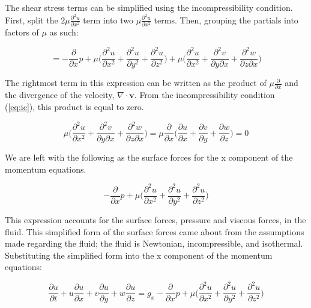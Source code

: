 \documentclass[twocolumn,12pth]{article}
\begin{document}
The shear stress terms can be simplified using the incompressibility condition.
First, split the $2\mu\frac{\partial^2u}{\partial{x}^2}$ term into two $\mu\frac{\partial^2u}{\partial{x}^2}$ terms.
Then, grouping the partials into factors of $\mu$ as such: 

\begin{equation*}
= -\frac{\partial}{\partial{x}}p + \mu \bigg( \frac{\partial^2u}{\partial{x}^2} + \frac{\partial^2u}{\partial{y}^2} + \frac{\partial^2u}{\partial{z}^2} \bigg) + \mu \bigg( \frac{\partial^2u}{\partial{x}^2} + \frac{\partial^2v}{\partial{y}\partial{x}} + \frac{\partial^2w}{\partial{z}\partial{x}}  \bigg)
\end{equation*}

The rightmost term in this expression can be written as the product of $\mu\frac{\partial}{\partial{x}}$ and the divergence of the velocity, $\nabla \cdot \mathbf{v}$.
From the incompressibility condition (\ref{eq:ic}), this product is equal to zero.

\begin{equation*}
\mu \bigg( \frac{\partial^2u}{\partial{x}^2} + \frac{\partial^2v}{\partial{y}\partial{x}} + \frac{\partial^2w}{\partial{z}\partial{x}}  \bigg) = \mu \frac{\partial}{\partial{x}} \bigg( \frac{\partial{u}}{\partial{x}} + \frac{\partial{v}}{\partial{y}} + \frac{\partial{w}}{\partial{z}}  \bigg) = 0
\end{equation*}

We are left with the following as the surface forces for the x component of the momentum equations.

\begin{equation}
-\frac{\partial}{\partial{x}}p + \mu \bigg( \frac{\partial^2u}{\partial{x}^2} + \frac{\partial^2u}{\partial{y}^2} + \frac{\partial^2u}{\partial{z}^2} \bigg)
\end{equation}

This expression accounts for the surface forces, pressure and viscous forces, in the fluid.
This simplified form of the surface forces came about from the assumptions made regarding the fluid; the fluid is Newtonian, incompressible, and isothermal.
Substituting the simplified form into the x component of the momentum equations:

\begin{equation}
\frac{\partial{u}}{\partial{t}} + u\frac{\partial{u}}{\partial{x}} + v\frac{\partial{u}}{\partial{y}} + w\frac{\partial{u}}{\partial{z}} = g_x -\frac{\partial}{\partial{x}}p + \mu \bigg( \frac{\partial^2u}{\partial{x}^2} + \frac{\partial^2u}{\partial{y}^2} + \frac{\partial^2u}{\partial{z}^2} \bigg)
\end{equation}
\end{document}
